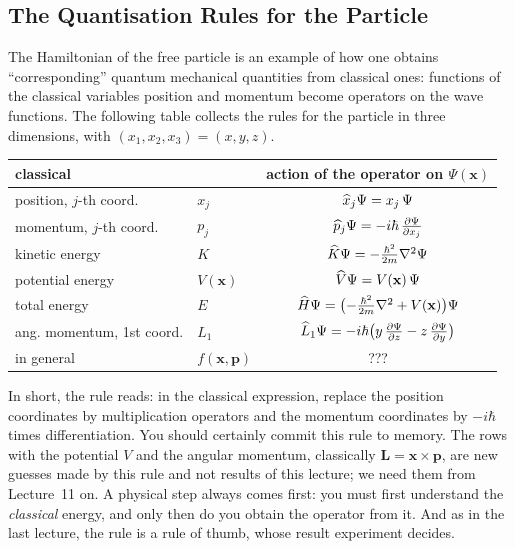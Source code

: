 \subsection{The Quantisation Rules for the Particle}
The Hamiltonian of the free particle is an example of how one obtains ``corresponding'' quantum mechanical quantities from classical ones: functions of the classical variables position and momentum become operators on the wave functions. The following table collects the rules for the particle in three dimensions, with $(x_1,x_2,x_3) = (x,y,z)$.
\begin{center}
\small\begin{tabular}{@{}llc@{}}    \toprule
\textbf{classical} & & \textbf{action of the operator on $\Psi(\mathbf{x})$}  \\\midrule
position, $j$-th coord. & $x_j$ & $\widehat{x}_j\Psi = x_j\,\Psi$  \\
\rowcolor{isabelline} momentum, $j$-th coord. & $p_j$ & $\widehat{p}_j\Psi = -i\hbar\,\frac{\partial\Psi}{\partial x_j}$  \\
kinetic energy & $K$ & $\widehat{K}\Psi = -\frac{\hbar^2}{2m}\nabla^2\Psi$ \\
\rowcolor{isabelline} potential energy & $V(\mathbf{x})$ & $\widehat{V}\Psi = V(\mathbf{x})\,\Psi$ \\
total energy & $E$ & $\widehat{H}\Psi = \bigl(-\frac{\hbar^2}{2m}\nabla^2 + V(\mathbf{x})\bigr)\Psi$ \\
\rowcolor{isabelline} ang. momentum, 1st coord. & $L_1$ & $\widehat{L}_1\Psi = -i\hbar\bigl(y\,\frac{\partial\Psi}{\partial z} - z\,\frac{\partial\Psi}{\partial y}\bigr)$  \\
in general & $f(\mathbf{x},\mathbf{p})$ & ??? \\
\bottomrule
\end{tabular}
\end{center}

In short, the rule reads: in the classical expression, replace the position coordinates by multiplication operators and the momentum coordinates by $-i\hbar$ times differentiation. You should certainly commit this rule to memory. The rows with the potential $V$ and the angular momentum, classically $\mathbf{L} = \mathbf{x}\times\mathbf{p}$, are new guesses made by this rule and not results of this lecture; we need them from Lecture~11 on. A physical step always comes first: you must first understand the \emph{classical} energy, and only then do you obtain the operator from it. And as in the last lecture, the rule is a rule of thumb, whose result experiment decides.

